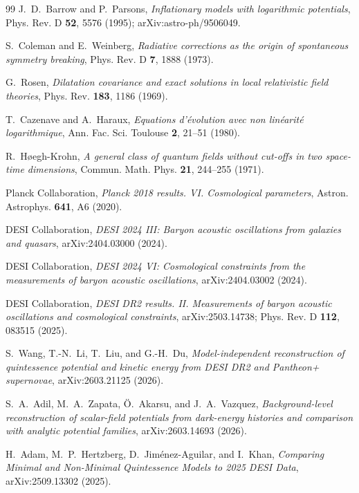 \documentclass[11pt,reqno]{amsart}
\theoremstyle{plain}
\theoremstyle{definition}
\theoremstyle{remark}
\begin{document}
\begin{thebibliography}{99}
J.~D.~Barrow and P.~Parsons,
\emph{Inflationary models with logarithmic potentials},
Phys. Rev. D \textbf{52}, 5576 (1995); arXiv:astro-ph/9506049.

S.~Coleman and E.~Weinberg,
\emph{Radiative corrections as the origin of spontaneous symmetry breaking},
Phys. Rev. D \textbf{7}, 1888 (1973).

G.~Rosen,
\emph{Dilatation covariance and exact solutions in local relativistic field theories},
Phys. Rev. \textbf{183}, 1186 (1969).

T.~Cazenave and A.~Haraux,
\emph{Equations d'\'evolution avec non lin\'earit\'e logarithmique},
Ann. Fac. Sci. Toulouse \textbf{2}, 21--51 (1980).

R.~H\o egh-Krohn,
\emph{A general class of quantum fields without cut-offs in two space-time dimensions},
Commun. Math. Phys. \textbf{21}, 244--255 (1971).

Planck Collaboration,
\emph{Planck 2018 results. VI. Cosmological parameters},
Astron. Astrophys. \textbf{641}, A6 (2020).

DESI Collaboration,
\emph{DESI 2024 III: Baryon acoustic oscillations from galaxies and quasars},
arXiv:2404.03000 (2024).

DESI Collaboration,
\emph{DESI 2024 VI: Cosmological constraints from the measurements of baryon acoustic oscillations},
arXiv:2404.03002 (2024).

DESI Collaboration,
\emph{DESI DR2 results. II. Measurements of baryon acoustic oscillations and cosmological constraints},
arXiv:2503.14738; Phys. Rev. D \textbf{112}, 083515 (2025).

S.~Wang, T.-N.~Li, T.~Liu, and G.-H.~Du,
\emph{Model-independent reconstruction of quintessence potential and kinetic energy from DESI DR2 and Pantheon+ supernovae},
arXiv:2603.21125 (2026).

S.~A.~Adil, M.~A.~Zapata, \"{O}.~Akarsu, and J.~A.~Vazquez,
\emph{Background-level reconstruction of scalar-field potentials from dark-energy histories and comparison with analytic potential families},
arXiv:2603.14693 (2026).

H.~Adam, M.~P.~Hertzberg, D.~Jim\'enez-Aguilar, and I.~Khan,
\emph{Comparing Minimal and Non-Minimal Quintessence Models to 2025 DESI Data},
arXiv:2509.13302 (2025).


\end{thebibliography}
\end{document}
